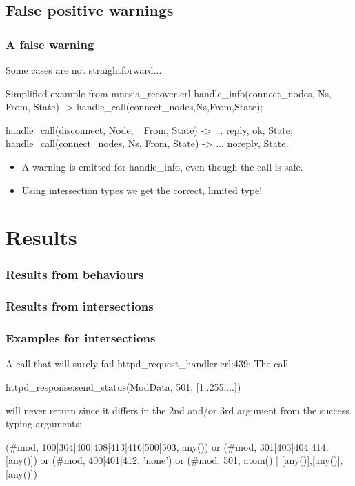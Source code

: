 \documentclass{beamer}
\begin{document}
\subsection{False positive warnings}

\begin{frame}[fragile]
  \frametitle{A false warning}
  Some cases are not straightforward...
\begin{code}{Simplified example from mnesia\_recover.erl}
  handle_info({connect_nodes, Ns, From}, State) ->
    handle_call({connect_nodes,Ns},From,State);

  handle_call({disconnect, Node}, _From, State) ->
    ...
    {reply, ok, State};
  handle_call({connect_nodes, Ns}, From, State) ->
    ...
    {noreply, State}.
\end{code}
  \pause
  \begin{itemize}
  \item A warning is emitted for handle\_info, even though the call is
    safe. \pause
  \item Using intersection types we get the correct, limited type!
  \end{itemize}
\end{frame}

\section{Results}

\begin{frame}
  \frametitle{Results from behaviours}
  
\end{frame}

\begin{frame}
  \frametitle{Results from intersections}
  
\end{frame}

\begin{frame}[fragile]
  \frametitle{Examples for intersections}
  \begin{code}{A call that will surely fail}
httpd_request_handler.erl:439: The call

  httpd_response:send_status(ModData, 501, [1..255,...])

  will never return since it differs in the 2nd and/or
  3rd argument from the success typing arguments:

  (#mod{}, 100|304|400|408|413|416|500|503, any()) or
  (#mod{}, 301|403|404|414, [any()]) or
  (#mod{}, 400|401|412, 'none') or
  (#mod{}, 501, {atom() | [any()],[any()],[any()]})

\end{code}
\end{frame}
\end{document}
